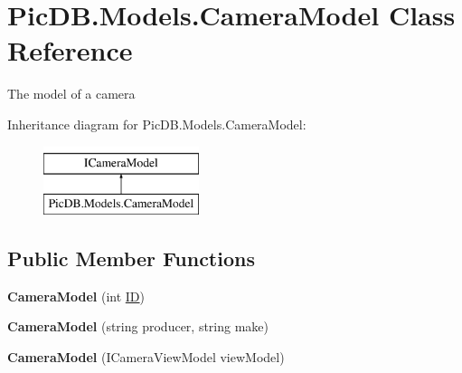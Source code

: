 \hypertarget{class_pic_d_b_1_1_models_1_1_camera_model}{}\section{Pic\+D\+B.\+Models.\+Camera\+Model Class Reference}
\label{class_pic_d_b_1_1_models_1_1_camera_model}


The model of a camera  


Inheritance diagram for Pic\+D\+B.\+Models.\+Camera\+Model\+:\begin{figure}[H]
\begin{center}
\leavevmode
\includegraphics[height=2.000000cm]{class_pic_d_b_1_1_models_1_1_camera_model}
\end{center}
\end{figure}
\subsection*{Public Member Functions}
\begin{DoxyCompactItemize}
\item 
\mbox{\label{class_pic_d_b_1_1_models_1_1_camera_model_a0dad4b416044ad3b261aad2f210f6fef}} 
{\bfseries Camera\+Model} (int \mbox{\hyperlink{class_pic_d_b_1_1_models_1_1_camera_model_a31394a505a536d6c692e4fc4b76213f4}{ID}})
\item 
\mbox{\label{class_pic_d_b_1_1_models_1_1_camera_model_a0c1ef897645616cef13e6a23c17e9105}} 
{\bfseries Camera\+Model} (string producer, string make)
\item 
\mbox{\label{class_pic_d_b_1_1_models_1_1_camera_model_a9c85f6901c6b6cb557d05075590604cb}} 
{\bfseries Camera\+Model} (I\+Camera\+View\+Model view\+Model)
\end{DoxyCompactItemize}
